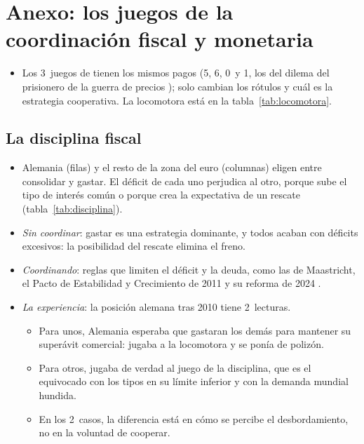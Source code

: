 \documentclass[11pt]{article}
\begin{document}
\section{Anexo: los juegos de la coordinación fiscal y monetaria}\label{anexo:juegos}

\begin{itemize}
\item Los 3~juegos de \textcite{Frankel2016Coordination} tienen los mismos pagos (5, 6, 0~y 1, los del dilema del prisionero de la guerra de precios ); solo cambian los rótulos y cuál es la estrategia cooperativa. La locomotora está en la tabla~\ref{tab:locomotora}.
\end{itemize}

\subsection*{La disciplina fiscal}

\begin{itemize}
\item Alemania (filas) y el resto de la zona del euro (columnas) eligen entre consolidar y gastar. El déficit de cada uno perjudica al otro, porque sube el tipo de interés común o porque crea la expectativa de un rescate (tabla~\ref{tab:disciplina}).
\item \emph{Sin coordinar}: gastar es una estrategia dominante, y todos acaban con déficits excesivos: la posibilidad del rescate elimina el freno.
\item \emph{Coordinando}: reglas que limiten el déficit y la deuda, como las de Maastricht, el Pacto de Estabilidad y Crecimiento de 2011 y su reforma de 2024\nocite{UE2011Reglamento1175,UE2024Reglamento1263} .
\item \emph{La experiencia}: la posición alemana tras 2010 tiene 2~lecturas.
  \begin{itemize}
  \item Para unos, Alemania esperaba que gastaran los demás para mantener su superávit comercial: jugaba a la locomotora y se ponía de polizón.
  \item Para otros, jugaba de verdad al juego de la disciplina, que es el equivocado con los tipos en su límite inferior y con la demanda mundial hundida.
  \item En los 2~casos, la diferencia está en cómo se percibe el desbordamiento, no en la voluntad de cooperar\nocite{Frankel2016Coordination}.
  \end{itemize}
\end{itemize}
\end{document}
